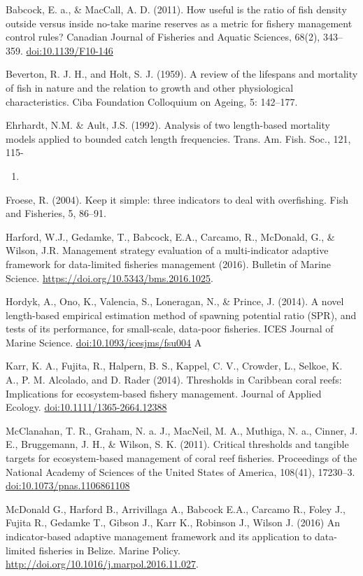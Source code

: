 \documentclass[]{book}
\begin{document}
Babcock, E. a., \& MacCall, A. D. (2011). How useful is the ratio of
fish density outside versus inside no-take marine reserves as a metric
for fishery management control rules? Canadian Journal of Fisheries and
Aquatic Sciences, 68(2), 343--359. \url{doi:10.1139/F10-146}

Beverton, R. J. H., and Holt, S. J. (1959). A review of the lifespans
and mortality of fish in nature and the relation to growth and other
physiological characteristics. Ciba Foundation Colloquium on Ageing, 5:
142--177.

Ehrhardt, N.M. \& Ault, J.S. (1992). Analysis of two length-based
mortality models applied to bounded catch length frequencies. Trans. Am.
Fish. Soc., 121, 115-

\begin{enumerate}
\def\labelenumi{\arabic{enumi}.}
\setcounter{enumi}{121}
\item
\end{enumerate}

Froese, R. (2004). Keep it simple: three indicators to deal with
overfishing. Fish and Fisheries, 5, 86--91.

Harford, W.J., Gedamke, T., Babcock, E.A., Carcamo, R., McDonald, G., \&
Wilson, J.R. Management strategy evaluation of a multi-indicator
adaptive framework for data-limited fisheries management (2016).
Bulletin of Marine Science. \url{https://doi.org/10.5343/bms.2016.1025}.

Hordyk, A., Ono, K., Valencia, S., Loneragan, N., \& Prince, J. (2014).
A novel length-based empirical estimation method of spawning potential
ratio (SPR), and tests of its performance, for small-scale, data-poor
fisheries. ICES Journal of Marine Science.
\url{doi:10.1093/icesjms/fsu004} A

Karr, K. A., Fujita, R., Halpern, B. S., Kappel, C. V., Crowder, L.,
Selkoe, K. A., P. M. Alcolado, and D. Rader (2014). Thresholds in
Caribbean coral reefs: Implications for ecosystem-based fishery
management. Journal of Applied Ecology.
\url{doi:10.1111/1365-2664.12388}

McClanahan, T. R., Graham, N. a. J., MacNeil, M. A., Muthiga, N. a.,
Cinner, J. E., Bruggemann, J. H., \& Wilson, S. K. (2011). Critical
thresholds and tangible targets for ecosystem-based management of coral
reef fisheries. Proceedings of the National Academy of Sciences of the
United States of America, 108(41), 17230--3.
\url{doi:10.1073/pnas.1106861108}

McDonald G., Harford B., Arrivillaga A., Babcock E.A., Carcamo R., Foley
J., Fujita R., Gedamke T., Gibson J., Karr K., Robinson J., Wilson J.
(2016) An indicator-based adaptive management framework and its
application to data-limited fisheries in Belize. Marine Policy.
\url{http://doi.org/10.1016/j.marpol.2016.11.027}.
\end{document}

